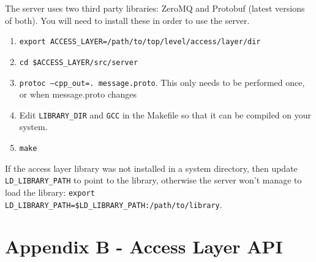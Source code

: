 \documentclass[a4paper,11pt]{article}
\begin{document}
The server uses two third party libraries: ZeroMQ and Protobuf (latest versions 
of both). You will need to install these in order to use the server.

\begin{enumerate}
 \item \texttt{export ACCESS\_LAYER=/path/to/top/level/access/layer/dir}
 \item \texttt{cd \$ACCESS\_LAYER/src/server}
 \item \texttt{protoc --cpp\_out=. message.proto}. This only needs to be 
performed once, or when message.proto changes
 \item Edit \texttt{LIBRARY\_DIR} and \texttt{GCC} in the Makefile so that it 
can be compiled on your system.
 \item \texttt{make}
\end{enumerate}

If the access layer library was not installed in a system directory, 
then update \texttt{LD\_LIBRARY\_PATH} to point to the library, otherwise the 
server won't manage to load the library: \texttt{export 
LD\_LIBRARY\_PATH=\$LD\_LIBRARY\_PATH:/path/to/library}.

\pagebreak

\section*{Appendix B - Access Layer API}
\label{API}

\end{document}
